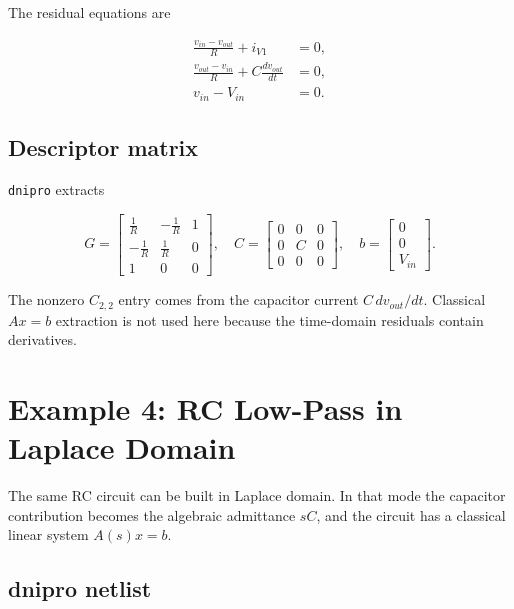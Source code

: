 \documentclass[11pt,a4paper]{article}
\newcommand{\project}{\texttt{dnipro}}
\begin{document}
The residual equations are

\begin{align}
    \frac{v_{in}-v_{out}}{R} + i_{V1} &= 0, \\
    \frac{v_{out}-v_{in}}{R} + C\frac{d v_{out}}{dt} &= 0, \\
    v_{in} - V_{in} &= 0.
\end{align}

\subsection{Descriptor matrix}

\project{} extracts

\begin{equation}
    G =
    \begin{bmatrix}
        \frac{1}{R} & -\frac{1}{R} & 1 \\
        -\frac{1}{R} & \frac{1}{R} & 0 \\
        1 & 0 & 0
    \end{bmatrix},
    \quad
    C =
    \begin{bmatrix}
        0 & 0 & 0 \\
        0 & C & 0 \\
        0 & 0 & 0
    \end{bmatrix},
    \quad
    b =
    \begin{bmatrix}
        0 \\
        0 \\
        V_{in}
    \end{bmatrix}.
\end{equation}

The nonzero \(C_{2,2}\) entry comes from the capacitor current
\(C\,d v_{out}/dt\). Classical \(A x=b\) extraction is not used here because the
time-domain residuals contain derivatives.

\section{Example 4: RC Low-Pass in Laplace Domain}
\label{sec:ex-rc-laplace}

The same RC circuit can be built in Laplace domain. In that mode the capacitor
contribution becomes the algebraic admittance \(sC\), and the circuit has a
classical linear system \(A(s)x=b\).

\subsection{dnipro netlist}
\end{document}
